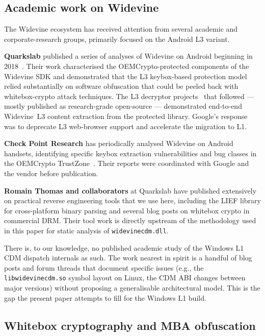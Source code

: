 \documentclass[11pt,letterpaper]{article}
\begin{document}
\subsection{Academic work on Widevine}
\label{sec:ante-widevine}

The Widevine ecosystem has received attention from several academic
and corporate-research groups, primarily focused on the Android L3
variant.

\textbf{Quarkslab} published a series of analyses of Widevine on
Android beginning in 2018~\cite{quarkslab-widevine,
quarkslab-android-widevine}. Their work characterised the
OEMCrypto-protected components of the Widevine SDK and demonstrated
that the L3 keybox-based protection model relied substantially on
software obfuscation that could be peeled back with whitebox-crypto
attack techniques. The L3 decryptor projects~\cite{l3-decryptor,
ango-l3-decryptor} that followed --- mostly published as
research-grade open-source --- demonstrated end-to-end Widevine~L3
content extraction from the protected library. Google's response was
to deprecate L3 web-browser support and accelerate the migration to
L1.

\textbf{Check Point Research} has periodically analysed Widevine on
Android handsets, identifying specific keybox extraction
vulnerabilities and bug classes in the OEMCrypto
TrustZone~\cite{checkpoint-widevine}. Their reports
were coordinated with Google and the vendor before publication.

\textbf{Romain Thomas and collaborators} at Quarkslab have published
extensively on practical reverse engineering tools that we use here,
including the LIEF library for cross-platform binary parsing
\cite{lief-tool} and several blog posts on whitebox crypto in
commercial DRM. Their tool work is directly upstream of the
methodology used in this paper for static analysis of
\texttt{widevinecdm.dll}.

There is, to our knowledge, no published academic study of the
Windows L1 CDM dispatch internals as such. The work nearest in
spirit is a handful of blog posts and forum threads that document
specific issues (e.g., the \texttt{libwidevinecdm.so} symbol layout
on Linux, the CDM ABI changes between major versions) without
proposing a generalisable architectural model. This is the gap the
present paper attempts to fill for the Windows L1 build.

\subsection{Whitebox cryptography and MBA obfuscation}
\label{sec:ante-whitebox}
\end{document}
